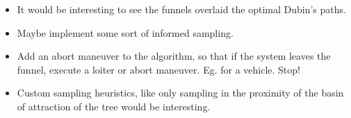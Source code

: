\begin{itemize}
  \item It would be interesting to see the funnels overlaid the optimal Dubin's paths.

  \item Maybe implement some sort of informed sampling.

  \item Add an abort maneuver to the \rrtfunnel{} algorithm, so that if the
    system leaves the funnel, execute a loiter or abort maneuver. Eg. for a
    vehicle. Stop!

  \item  Custom sampling heuristics, like only sampling in the proximity of the
    basin of attraction of the tree would be interesting.

\end{itemize}